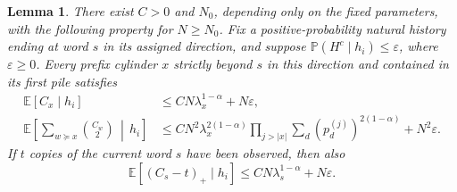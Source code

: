 \documentclass[11pt]{article}
\numberwithin{equation}{section}
\newtheorem{lemma}[theorem]{Lemma}
\theoremstyle{definition}
\theoremstyle{remark}
\newcommand{\E}{\mathbb E}
\newcommand{\Pp}{\mathbb P}
\newcommand{\1}{\mathbf 1}
\begin{document}
\begin{lemma}%
\label{lem:upper-reservoir}
There exist $C>0$ and $N_0$, depending only on the fixed parameters,
with the following property for $N\ge N_0$.
Fix a positive-probability natural history ending at word $s$ in its
assigned direction, and suppose $\Pp(H^c\mid h_i)\le\varepsilon$,
where $\varepsilon\ge0$. Every prefix cylinder $x$ strictly beyond $s$ in this
direction and contained in its first pile satisfies
\begin{align}
 \E[C_x\mid h_i]&\le CN\lambda_x^{1-\alpha}+N\varepsilon,
                                           \label{eq:upper-reservoir-count}\\
 \E\left[\sum_{w\succeq x}\binom{C_w}{2}\,\middle|\,h_i\right]
 &\le CN^2\lambda_x^{2(1-\alpha)}
       \prod_{j>|x|}\sum_d(p_d^{(j)})^{2(1-\alpha)}
                  +N^2\varepsilon.          \label{eq:upper-reservoir-pairs}
\end{align}
If $t$ copies of the current word $s$ have been observed, then also
\begin{equation}\label{eq:upper-extra-copies}
 \E[(C_s-t)_+\mid h_i]
       \le CN\lambda_s^{1-\alpha}+N\varepsilon.
\end{equation}
\end{lemma}
\end{document}
